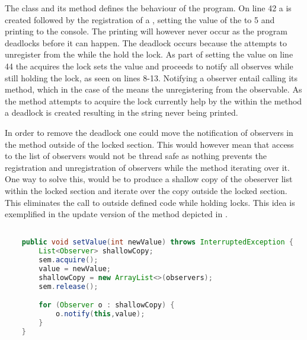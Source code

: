 The  class and its  method defines the behaviour of the program. On line 42 a  is created followed by the registration of a , setting the value of the  to 5 and printing  to the console. The printing will however never occur as the program deadlocks before it can happen. The deadlock occurs because the  attempts to unregister from the  while the  hold the lock. As part of setting the value on line 44 the  acquires the lock sets the value and proceeds to notify all observes while still holding the lock, as seen on lines 8-13. Notifying a observer entail calling its  method, which in the case of the  means the  unregistering from the observable. As the  method attempts to acquire the lock currently help by the  within the  method a deadlock is created resulting in the  string never being printed.

In order to remove the deadlock one could move the notification of observers in the  method outside of the locked section. This would however mean that access to the list of observers would not be thread safe as nothing prevents the registration and unregistration of observers while the  method iterating over it. One way to solve this, would be to produce a shallow copy of the obeserver list within the locked section and iterate over the copy outside the locked section. This eliminates the call to outside defined code while holding locks. This idea is exemplified in the update version of the  method depicted in .

\begin{lstlisting}[float,label=lst:observer_updated,
  caption={Observer pattern with locks},
  language=Java,  
  showspaces=false,
  showtabs=false,
  breaklines=true,
  showstringspaces=false,
  breakatwhitespace=true,
  commentstyle=\color{greencomments},
  keywordstyle=\color{bluekeywords},
  stringstyle=\color{redstrings}]  % Start your code-block

    public void setValue(int newValue) throws InterruptedException {
        List<Observer> shallowCopy;
        sem.acquire();
        value = newValue;
        shallowCopy = new ArrayList<>(observers);
        sem.release();

        for (Observer o : shallowCopy) {
            o.notify(this,value);
        }
    }
\end{lstlisting}


